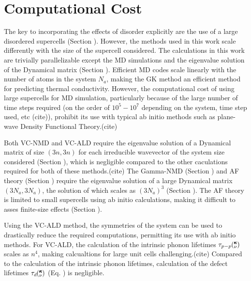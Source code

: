 \documentclass[aps,prb,onecolumn,preprint,superscriptaddress,amsmath,amssymb,floatfix]{revtex4}
\newcommand{\kv}{\mspace{-4.0mu}\left(\mspace{-8.0mu}
\begin{smallmatrix}&\pmb{\kappa} \\&\nu\end{smallmatrix}
\mspace{-3.0mu}\right)}
\begin{document}
\section{\label{A:Computational Cost}
Computational Cost}

The key to incorporating the effects of disorder explicitly are the use 
of a large disordered supercells (Section ).  However, the methods used 
in this work scale differently with the size of the supercell considered. 
The calculations in this work are trivially parallelizable\cite{} 
except the 
MD simulations\cite{plimpton_fast_1995} and the eigenvalue solution of the 
Dynamical matrix (Section ).\cite{gale_general_2003} Efficient MD 
codes scale linearly with the number of atoms in the system $N_a$, making 
the GK method an efficient method for predicting thermal conductivity. 
However, the computational cost of using large supercells for MD simulation, 
particularly because of the large number of time steps required 
(on the order of $10^5 - 10^7$ depending on the 
system, time step used, etc (cite)), prohibit its use with typical 
ab initio methods such as plane-wave Density Functional Theory.(cite) 

Both VC-NMD and VC-ALD require the eigenvalue solution 
of a Dynamical matrix of size $(3n,3n)$ for each irreducible wavevector 
of the system size considered (Section ), 
which is negligible compared to the other 
caculations required for both of these methods.(cite) 
The Gamma-NMD (Section ) and AF theory (Section ) 
require the eigenvalue solution of a large Dynamical matrix $(3N_a,3N_a)$, 
the solution of which scales as $(3N_a)^3$ (Section ). 
The AF theory is limited 
to small supercells using ab initio calculations, making it difficult 
to asses finite-size effects (Section ).  

Using the VC-ALD method, the symmetries of the system can be 
used to drastically reduce the required computations, permitting its 
use with ab initio methods.
\cite{esfarjani_method_2008,turney_predicting_2009,
esfarjani_heat_2011,chaput_phonon-phonon_2011} 
For VC-ALD, the calculation of the intrinsic phonon 
lifetimes $\tau_{p-p}\kv$ scales as $n^4$,\cite{turney_predicting_2009}  
making calcualtions for large unit cells challenging.(cite) 
Compared to 
the calculation of the intrinsic phonon lifetimes, calculation 
of the defect lifetimes $\tau_d\kv$ (Eq. ) is negligible.
\end{document}
